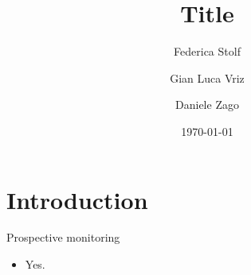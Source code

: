 \documentclass[handout, aspectratio=169]{beamer} %
\title[]{Title}
\institute[]{\textit{Department of Statistical Sciences, University of Padova}}
\author[]{Federica Stolf \and Gian Luca Vriz \and Daniele Zago}
\date{\today}
\begin{document}
\begin{frame}
	\titlepage
\end{frame}


\section{Introduction}

\begin{frame}{Prospective monitoring}
  \begin{itemize}
    \item Yes. \cite{dunson2018}
  \end{itemize}
\end{frame}



\printbibliography
\end{document}

